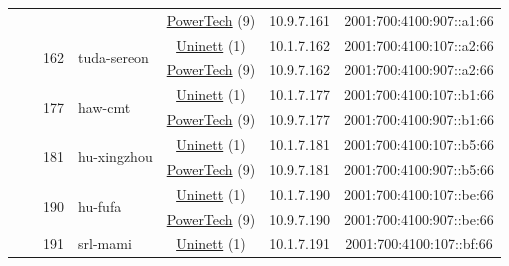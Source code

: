 \begin{small}
\begin{center}
\begin{longtable}{|c|c|c|c|c|c|c|c|}
  &  &  &  & \multicolumn{2}{|c|}{\tiny{\href{http://www.powertech.no}{PowerTech} (9)}} & \tiny{10.9.7.161} & \tiny{2001:700:4100:907::a1:66} \\* \cline{3-3}\cline{4-4}\cline{5-5}\cline{6-6}\cline{7-7}\cline{8-8}
  &  & \multirow{2}{*}{\tiny{162}} & \multicolumn{1}{|l|}{\multirow{2}{*}{\tiny{tuda-sereon}}} & \multicolumn{2}{|c|}{\tiny{\href{https://www.uninett.no}{Uninett} (1)}} & \tiny{10.1.7.162} & \tiny{2001:700:4100:107::a2:66} \\* \cline{5-5}\cline{6-6}\cline{7-7}\cline{8-8}
  &  &  &  & \multicolumn{2}{|c|}{\tiny{\href{http://www.powertech.no}{PowerTech} (9)}} & \tiny{10.9.7.162} & \tiny{2001:700:4100:907::a2:66} \\* \cline{3-3}\cline{4-4}\cline{5-5}\cline{6-6}\cline{7-7}\cline{8-8}
  &  & \multirow{2}{*}{\tiny{177}} & \multicolumn{1}{|l|}{\multirow{2}{*}{\tiny{haw-cmt}}} & \multicolumn{2}{|c|}{\tiny{\href{https://www.uninett.no}{Uninett} (1)}} & \tiny{10.1.7.177} & \tiny{2001:700:4100:107::b1:66} \\* \cline{5-5}\cline{6-6}\cline{7-7}\cline{8-8}
  &  &  &  & \multicolumn{2}{|c|}{\tiny{\href{http://www.powertech.no}{PowerTech} (9)}} & \tiny{10.9.7.177} & \tiny{2001:700:4100:907::b1:66} \\* \cline{3-3}\cline{4-4}\cline{5-5}\cline{6-6}\cline{7-7}\cline{8-8}
  &  & \multirow{2}{*}{\tiny{181}} & \multicolumn{1}{|l|}{\multirow{2}{*}{\tiny{hu-xingzhou}}} & \multicolumn{2}{|c|}{\tiny{\href{https://www.uninett.no}{Uninett} (1)}} & \tiny{10.1.7.181} & \tiny{2001:700:4100:107::b5:66} \\* \cline{5-5}\cline{6-6}\cline{7-7}\cline{8-8}
  &  &  &  & \multicolumn{2}{|c|}{\tiny{\href{http://www.powertech.no}{PowerTech} (9)}} & \tiny{10.9.7.181} & \tiny{2001:700:4100:907::b5:66} \\* \cline{3-3}\cline{4-4}\cline{5-5}\cline{6-6}\cline{7-7}\cline{8-8}
  &  & \multirow{2}{*}{\tiny{190}} & \multicolumn{1}{|l|}{\multirow{2}{*}{\tiny{hu-fufa}}} & \multicolumn{2}{|c|}{\tiny{\href{https://www.uninett.no}{Uninett} (1)}} & \tiny{10.1.7.190} & \tiny{2001:700:4100:107::be:66} \\* \cline{5-5}\cline{6-6}\cline{7-7}\cline{8-8}
  &  &  &  & \multicolumn{2}{|c|}{\tiny{\href{http://www.powertech.no}{PowerTech} (9)}} & \tiny{10.9.7.190} & \tiny{2001:700:4100:907::be:66} \\* \cline{3-3}\cline{4-4}\cline{5-5}\cline{6-6}\cline{7-7}\cline{8-8}
  &  & \multirow{2}{*}{\tiny{191}} & \multicolumn{1}{|l|}{\multirow{2}{*}{\tiny{srl-mami}}} & \multicolumn{2}{|c|}{\tiny{\href{https://www.uninett.no}{Uninett} (1)}} & \tiny{10.1.7.191} & \tiny{2001:700:4100:107::bf:66} \\* \cline{5-5}\cline{6-6}\cline{7-7}\cline{8-8}

\end{longtable}
\end{center}
\end{small}

